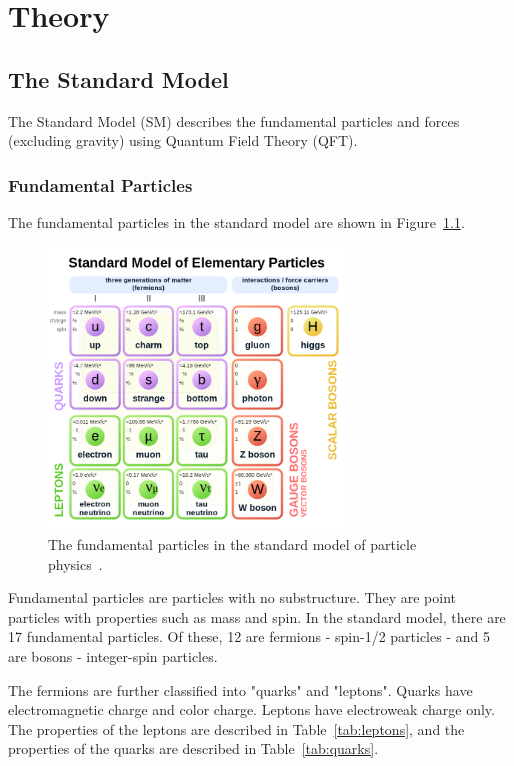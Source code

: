 \chapter{Theory}\label{chap:cms}



\section{The Standard Model}

The Standard Model (SM) describes the fundamental particles and forces (excluding gravity) using Quantum Field Theory (QFT).


\subsection{Fundamental Particles}

The fundamental particles in the standard model are shown in Figure~\ref{fig:sm}.

\begin{figure}[h]
	\centering
	\includegraphics[width=0.7\textwidth]{figures/sm_blocks.png}
	\caption{The fundamental particles in the standard model of particle physics~\cite{StandardModel}.}
	\label{fig:sm}
\end{figure}



Fundamental particles are particles with no substructure. They are point particles with properties such as mass and spin. In the standard model, there are 17 fundamental particles. Of these, 12 are fermions - spin-1/2 particles - and 5 are bosons - integer-spin particles. 

The fermions are further classified into "quarks" and "leptons". Quarks have electromagnetic charge and color charge. Leptons have electroweak charge only. The properties of the leptons are described in Table~\ref{tab:leptons}, and the properties of the quarks are described in Table~\ref{tab:quarks}. 





